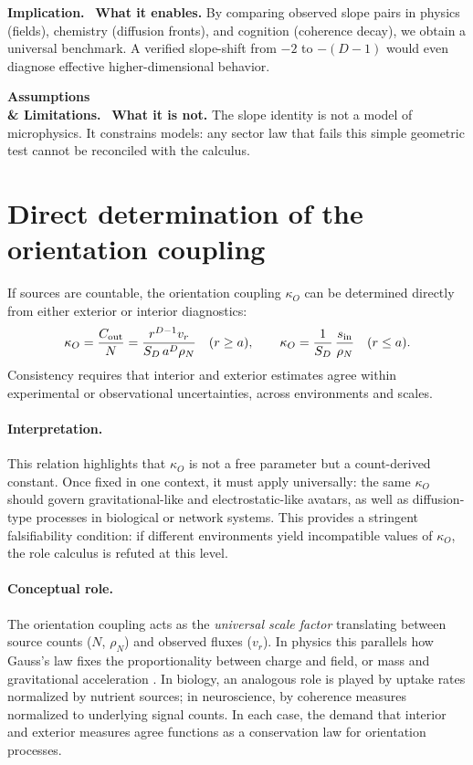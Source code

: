 \documentclass[12pt,a4paper,oneside]{scrreprt}
\newenvironment{implication}{\par\vspace{0.5em}\noindent\textbf{Implication.}\ }{\par\vspace{0.5em}}
\newenvironment{limitation}{\par\vspace{0.5em}\noindent\textbf{Assumptions \\ \& Limitations.}\ }{\par\vspace{0.5em}}
\begin{document}
\begin{implication}
\textbf{What it enables.} 
By comparing observed slope pairs in physics (fields), chemistry (diffusion fronts), 
and cognition (coherence decay), we obtain a universal benchmark. 
A verified slope-shift from $-2$ to $-(D-1)$ would even diagnose 
effective higher-dimensional behavior. 
\end{implication}

\begin{limitation}
\textbf{What it is not.} 
The slope identity is not a model of microphysics. 
It constrains models: any sector law that fails this simple geometric test 
cannot be reconciled with the calculus.
\end{limitation}


\section{Direct determination of the orientation coupling}\label{sec:ur-kappa}

If sources are countable, the orientation coupling $\kappa_O$ can be determined directly from either 
exterior or interior diagnostics:
\begin{equation}
\kappa_O = \frac{C_{\rm out}}{N} 
= \frac{r^{D-1} v_r}{S_D \, a^{D} \rho_N} \quad (r \ge a),
\qquad 
\kappa_O = \frac{1}{S_D} \, \frac{s_{\rm in}}{\rho_N} \quad (r \le a).
\end{equation}
Consistency requires that interior and exterior estimates agree within experimental or 
observational uncertainties, across environments and scales. 

\paragraph{Interpretation.} 
This relation highlights that $\kappa_O$ is not a free parameter but a 
count-derived constant. 
Once fixed in one context, it must apply universally: the same $\kappa_O$ 
should govern gravitational-like and electrostatic-like avatars, as well as 
diffusion-type processes in biological or network systems. 
This provides a stringent falsifiability condition: if different environments 
yield incompatible values of $\kappa_O$, the role calculus is refuted at this level. 

\paragraph{Conceptual role.} 
The orientation coupling acts as the \emph{universal scale factor} translating 
between source counts ($N$, $\rho_N$) and observed fluxes ($v_r$). 
In physics this parallels how Gauss’s law fixes the proportionality between 
charge and field, or mass and gravitational acceleration \citep{Jackson1999Classical}. 
In biology, an analogous role is played by uptake rates normalized by nutrient 
sources; in neuroscience, by coherence measures normalized to underlying 
signal counts. 
In each case, the demand that interior and exterior measures agree functions as 
a conservation law for orientation processes. 
\end{document}
